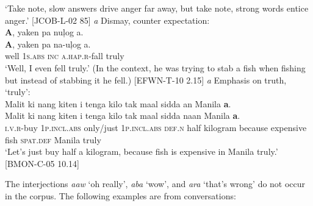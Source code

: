 \glt `Take note, slow answers drive anger far away, but take note, strong words entice anger.’ [JCOB-L-02 85]
\z
\ea 
\label{bkm:Ref118532820}
\textit{a} Dismay, counter expectation: \\
\textbf{A},  yaken  pa  nuļog  a. \\\smallskip
\gll \textbf{A},  yaken  pa  na-uļog  a. \\
well  1\textsc{s.abs}  \textsc{inc}  \textsc{a.hap.r}-fall  truly \\
\glt ‘Well, I even fell truly.’ (In the context, he was trying to stab a fish when fishing but instead of stabbing it he fell.) [EFWN-T-10 2.15]
\z
\ea
\label{bkm:Ref118532950}
\textit{a} Emphasis on truth, ‘truly’: \\
Malit  ki  nang  kiten  i  tenga  kilo  tak  maal sidda  an  Manila  \textbf{a}. \\\smallskip
\gll Malit  ki  nang  kiten  i  tenga  kilo  tak  maal sidda  naan  Manila  \textbf{a}. \\
\textsc{i.v.r}-buy  1\textsc{p.incl.abs}  only/just  1\textsc{p.incl.abs}  \textsc{def.n}  half  kilogram  because  expensive fish  \textsc{spat.def}  Manila  truly \\
\glt `Let’s just buy half a kilogram, because fish is expensive in Manila truly.’ [BMON-C-05 10.14]
\z

The interjections \textit{aaw} ‘oh really’, \textit{aba} ‘wow’, and \textit{ara} ‘that’s wrong’ do not occur in the corpus. The following examples are from conversations:

